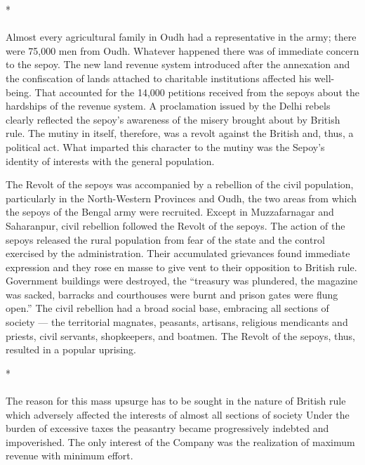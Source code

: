 \begin{multicols}{2}
\begin{center}*\end{center}

\paragraph*{}
Almost every agricultural family in Oudh had a representative in the army; there were 75,000 men from Oudh. Whatever happened there was of immediate concern to the sepoy. The new land revenue system introduced after the annexation and the confiscation of lands attached to charitable institutions affected his well-being. That accounted for the 14,000 petitions received from the sepoys about the hardships of the revenue system. A proclamation issued by the Delhi rebels clearly reflected the sepoy's awareness of the misery brought about by British rule. The mutiny in itself, therefore, was a revolt against the British and, thus, a political act. What imparted this character to the mutiny was the Sepoy's identity of interests with the general population.

The Revolt of the sepoys was accompanied by a rebellion of the civil population, particularly in the North-Western Provinces and Oudh, the two areas from which the sepoys of the Bengal army were recruited. Except in Muzzafarnagar and Saharanpur, civil rebellion followed the Revolt of the sepoys. The action of the sepoys released the rural population from fear of the state and the control exercised by the administration. Their accumulated grievances found immediate expression and they rose en masse to give vent to their opposition to British rule. Government buildings were destroyed, the ``treasury was plundered, the magazine was sacked, barracks and courthouses were burnt and prison gates were flung open.'' The civil rebellion had a broad social base, embracing all sections of society --- the territorial magnates, peasants, artisans, religious mendicants and priests, civil servants, shopkeepers, and boatmen. The Revolt of the sepoys, thus, resulted in a popular uprising.

\begin{center}*\end{center}

\paragraph*{}
The reason for this mass upsurge has to be sought in the nature of British rule which adversely affected the interests of almost all sections of society Under the burden of excessive taxes the peasantry became progressively indebted and impoverished. The only interest of the Company was the realization of maximum revenue with minimum effort.


\end{multicols}
